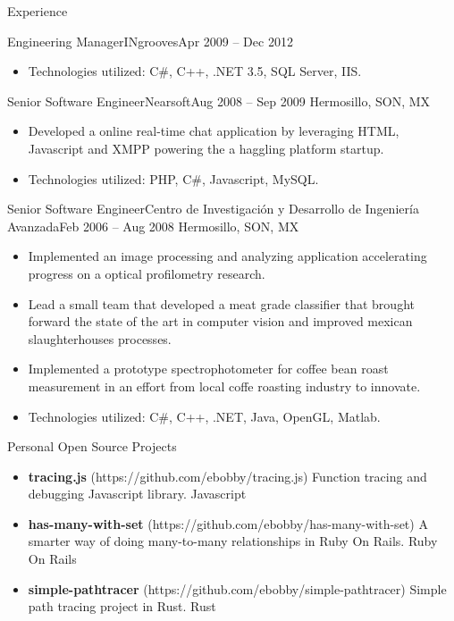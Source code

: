 \documentclass[calibri]{mcdowellcv}
\begin{document}
\begin{cvsection}{Experience}
\begin{cvsubsection}{Engineering Manager}{INgrooves}{Apr 2009 -- Dec 2012}
\begin{itemize}
			\item Technologies utilized: C\#, C++, .NET 3.5, SQL Server, IIS.
		\end{itemize}
	\end{cvsubsection}
	\vskip 0.3in
	\begin{cvsubsection}{Senior Software Engineer}{Nearsoft}{Aug 2008 -- Sep 2009}
		Hermosillo, SON, MX
		\begin{itemize}%
			\item Developed a online real-time chat application by leveraging HTML, Javascript and XMPP powering the a haggling platform startup.
			\item Technologies utilized: PHP, C\#, Javascript, MySQL.
		\end{itemize}
	\end{cvsubsection}
	\vskip 0.3in
	\begin{cvsubsection}{Senior Software Engineer}{Centro de Investigación y Desarrollo de Ingeniería Avanzada}{Feb 2006 -- Aug 2008}
		Hermosillo, SON, MX
		\begin{itemize}%
			\item Implemented an image processing and analyzing application accelerating progress on a optical profilometry research.
			\item Lead a small team that developed a meat grade classifier that brought forward the state of the art in computer vision and improved mexican slaughterhouses processes.
			\item Implemented a prototype spectrophotometer for coffee bean roast measurement in an effort from local coffe roasting industry to innovate.
			\item Technologies utilized: C\#, C++, .NET, Java, OpenGL, Matlab.
		\end{itemize}
	\end{cvsubsection}
\end{cvsection}
\vskip 0.3in
\begin{cvsection}{Personal Open Source Projects}
	\begin{cvsubsection}{}{}{}
		\begin{itemize}
			\setlength\itemsep{3pt}
			\item \textbf{tracing.js} (https://github.com/ebobby/tracing.js)  Function tracing and debugging Javascript library. Javascript
			\item \textbf{has-many-with-set} (https://github.com/ebobby/has-many-with-set)  A smarter way of doing many-to-many relationships in Ruby On Rails. Ruby On Rails
			\item \textbf{simple-pathtracer} (https://github.com/ebobby/simple-pathtracer)  Simple path tracing project in Rust. Rust
		\end{itemize}
	\end{cvsubsection}
\end{cvsection}
\end{document}
